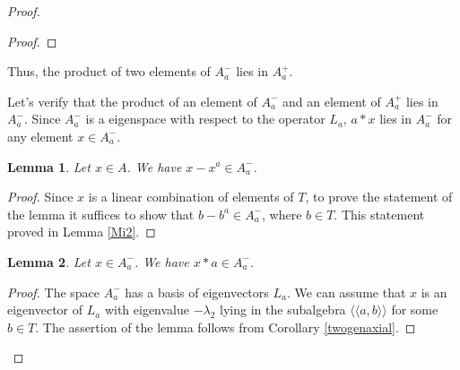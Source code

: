 \documentclass[12pt]{article}
\newcommand\lm{\lambda}
\newcommand\la{\langle}
\newcommand\ra{\rangle}
\newcommand\lla{\la\!\la}
\newcommand\rra{\ra\!\ra}
\newtheorem{lem}{Lemma}
\begin{document}
\begin{proof}
\begin{proof}
	
		
	
\end{proof}
	
	Thus, the product of two elements of $A_a^-$ lies in $A_a^+$.
	
	Let's verify that the product of an element of $A^-_a$ and an element of $A^+_a$ lies in $A^-_a$. Since $A^-_a$ is a eigenspace with respect to the operator $L_a$, $a*x$ lies in $A^-_a$ for any element $x\in A^-_a$.
	
	\begin{lem}\label{xmx}
		Let $x\in A$. We have $x-x^a\in A^-_a$.
	\end{lem}
	\begin{proof}
		Since $x$ is a linear combination of elements of $T$, to prove the statement of the lemma it suffices to show that $b-b^a\in A^-_a$, where $b\in T$. This statement proved in Lemma \ref{Mi2}.
	\end{proof}
	\begin{lem}\label{betia}
		Let $x\in A^-_a$. We have $x*a\in A^-_a$.
	\end{lem}
	\begin{proof}
The space $A_a^-$ has a basis of eigenvectors $L_a$. We can assume that $x$ is an eigenvector of $L_a$ with eigenvalue $-\lm_2$ lying in the subalgebra $\lla a,b\rra$ for some $b\in T$.
The assertion of the lemma follows from Corollary \ref{twogenaxial}.
\end{proof}	
		
		
	

\end{proof}
\end{document}
